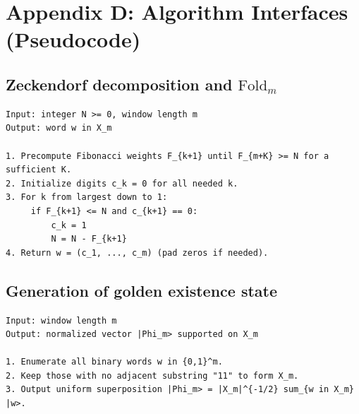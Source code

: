 \section{Appendix D: Algorithm Interfaces (Pseudocode)}

\subsection{Zeckendorf decomposition and \texorpdfstring{$\mathrm{Fold}_m$}{Fold\_m}}

\begin{Verbatim}
Input: integer N >= 0, window length m
Output: word w in X_m

1. Precompute Fibonacci weights F_{k+1} until F_{m+K} >= N for a sufficient K.
2. Initialize digits c_k = 0 for all needed k.
3. For k from largest down to 1:
     if F_{k+1} <= N and c_{k+1} == 0:
         c_k = 1
         N = N - F_{k+1}
4. Return w = (c_1, ..., c_m) (pad zeros if needed).
\end{Verbatim}

\subsection{Generation of golden existence state}

\begin{Verbatim}
Input: window length m
Output: normalized vector |Phi_m> supported on X_m

1. Enumerate all binary words w in {0,1}^m.
2. Keep those with no adjacent substring "11" to form X_m.
3. Output uniform superposition |Phi_m> = |X_m|^{-1/2} sum_{w in X_m} |w>.
\end{Verbatim}
